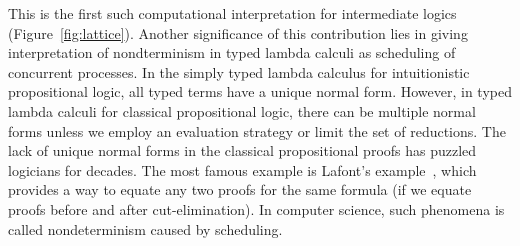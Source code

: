 This is the first such computational
interpretation for intermediate logics (Figure~\ref{fig:lattice}).
Another significance of this contribution
lies in giving interpretation of nondterminism in typed
lambda calculi as scheduling of concurrent processes.
In the simply typed lambda calculus for intuitionistic
propositional logic, all typed terms have a unique normal form.
However, in typed lambda calculi for classical propositional logic,
there can be multiple normal forms unless we employ an evaluation
strategy or limit the set of reductions.
The lack of unique normal forms in the classical propositional proofs
has puzzled logicians for decades.
The most famous example is Lafont's
example~\citep[B.1.]{girard1989proofs}, which provides a way to equate
any two proofs for the same formula (if we equate proofs before and
after cut-elimination).
In computer science, such phenomena is called nondeterminism caused by scheduling.
